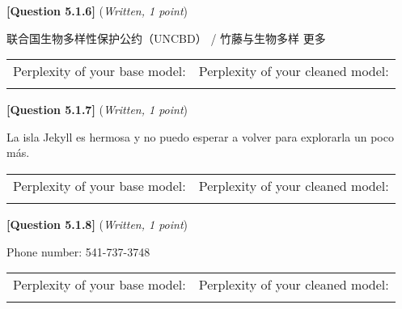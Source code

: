 \documentclass[leqno,12pt]{article}
\begin{document}
\noindent \textbf{[Question 5.1.6]} (\emph{Written, 1 point})
\begin{tcolorbox}[colback=blue!5!white,colframe=blue!75!black]
 联合国生物多样性保护公约（UNCBD） / 竹藤与生物多样 更多
\end{tcolorbox}
\begin{tabular}{cc}
         Perplexity of your base model:  & Perplexity of your cleaned model: 
 \\
       \begin{tcolorbox}[fit,height=1cm, width=0.4\linewidth, blank, borderline={1pt}{-2pt}]
\end{tcolorbox}  & \begin{tcolorbox}[fit,height=1cm, width=0.4\linewidth, blank, borderline={1pt}{-2pt}]
\end{tcolorbox}
\end{tabular}

\noindent \textbf{[Question 5.1.7]} (\emph{Written, 1 point})
\begin{tcolorbox}[colback=blue!5!white,colframe=blue!75!black]
La isla Jekyll es hermosa y no puedo esperar a volver para explorarla un poco más.
\end{tcolorbox}
\begin{tabular}{cc}
         Perplexity of your base model:  & Perplexity of your cleaned model: 
 \\
       \begin{tcolorbox}[fit,height=1cm, width=0.4\linewidth, blank, borderline={1pt}{-2pt}]
\end{tcolorbox}  & \begin{tcolorbox}[fit,height=1cm, width=0.4\linewidth, blank, borderline={1pt}{-2pt}]
\end{tcolorbox}
\end{tabular}

\noindent \textbf{[Question 5.1.8]} (\emph{Written, 1 point})
\begin{tcolorbox}[colback=blue!5!white,colframe=blue!75!black]
Phone number:
541-737-3748
\end{tcolorbox}


\begin{tabular}{cc}
         Perplexity of your base model:  & Perplexity of your cleaned model: 
 \\
       \begin{tcolorbox}[fit,height=1cm, width=0.4\linewidth, blank, borderline={1pt}{-2pt}]
\end{tcolorbox}  & \begin{tcolorbox}[fit,height=1cm, width=0.4\linewidth, blank, borderline={1pt}{-2pt}]
\end{tcolorbox}
\end{tabular}
\end{document}
